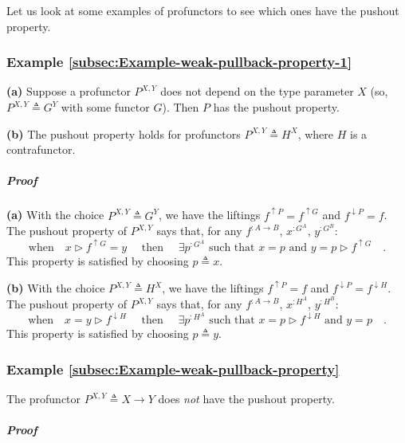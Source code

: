 Let us look at some examples of profunctors to see which ones have
the pushout property.

\subsubsection{Example \label{subsec:Example-weak-pullback-property-1}\ref{subsec:Example-weak-pullback-property-1}}

\textbf{(a)} Suppose a profunctor $P^{X,Y}$ does not depend on the
type parameter $X$ (so, $P^{X,Y}\triangleq G^{Y}$ with some functor
$G$). Then $P$ has the pushout property. 

\textbf{(b)} The pushout property holds for profunctors $P^{X,Y}\triangleq H^{X}$,
where $H$ is a contrafunctor.

\subparagraph{Proof}

\textbf{(a)} With the choice $P^{X,Y}\triangleq G^{Y}$, we have the
liftings $f^{\uparrow P}=f^{\uparrow G}$ and $f^{\downarrow P}=f$.
The pushout property of $P^{X,Y}$ says that, for any $f^{:A\rightarrow B}$,
$x^{:G^{A}}$, $y^{:G^{B}}$:
\[
\text{when}\quad x\triangleright f^{\uparrow G}=y\quad\text{ then }\quad\exists p^{:G^{A}}\text{ such that }x=p\text{ and }y=p\triangleright f^{\uparrow G}\quad.
\]
This property is satisfied by choosing $p\triangleq x$.

\textbf{(b)} With the choice $P^{X,Y}\triangleq H^{X}$, we have the
liftings $f^{\uparrow P}=f$ and $f^{\downarrow P}=f^{\downarrow H}$.
The pushout property of $P^{X,Y}$ says that, for any $f^{:A\rightarrow B}$,
$x^{:H^{A}}$, $y^{:H^{B}}$:
\[
\text{when}\quad x=y\triangleright f^{\downarrow H}\quad\text{ then }\quad\exists p^{:H^{A}}\text{ such that }x=p\triangleright f^{\downarrow H}\text{ and }y=p\quad.
\]
This property is satisfied by choosing $p\triangleq y$.

\subsubsection{Example \label{subsec:Example-weak-pullback-property}\ref{subsec:Example-weak-pullback-property}}

The profunctor $P^{X,Y}\triangleq X\rightarrow Y$ does \emph{not}
have the pushout property.

\subparagraph{Proof}

